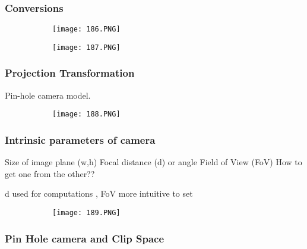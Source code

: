 \documentclass{article}
\begin{document}
\vspace{30mm}

\subsubsection{Conversions}


\begin{figure}[ht!]
  \centering
  \begin{subfigure}[b]{0.4\linewidth}
    \texttt{[image: 186.PNG]}
  \end{subfigure}
  \begin{subfigure}[b]{0.4\textwidth}
         \centering
         \texttt{[image: 187.PNG]}
     \end{subfigure}
\end{figure}

\subsubsection{Projection Transformation}

Pin-hole camera model.


\begin{figure}[ht!]
  \centering
  \begin{subfigure}[b]{0.35\linewidth}
    \texttt{[image: 188.PNG]}
  \end{subfigure}
\end{figure}

\subsubsection{Intrinsic parameters of camera}

Size of image plane (w,h)
Focal distance (d) or angle Field of View (FoV)
How to get one from the other??

d used for computations , FoV more intuitive to set

\begin{figure}[ht!]
  \centering
  \begin{subfigure}[b]{0.35\linewidth}
    \texttt{[image: 189.PNG]}
  \end{subfigure}
\end{figure}

\subsubsection{Pin Hole camera and Clip Space}
\end{document}
